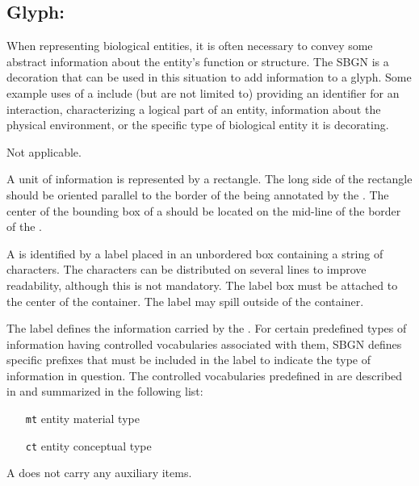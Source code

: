\color{blue}

\subsection{Glyph: }
\label{sec:unitInformation}

When representing biological entities, it is often necessary to convey some abstract information about the entity's function or structure.  The SBGN  is a decoration that can be used in this situation to add information to a glyph.  Some example uses of a  include (but are not limited to) providing an identifier for an interaction, characterizing a logical part of an entity, information about the physical environment, or the specific type of biological entity it is decorating.

\begin{glyphDescription}

\glyphSboTerm Not applicable.

\glyphContainer A unit of information is represented by a rectangle.  The long side of the rectangle should be oriented parallel to the border of the  being annotated by the . The center of the bounding box of a  should be located on the mid-line of the border of the .

\glyphLabel A  is identified by a label placed in an unbordered box containing a string of characters.  The characters can be distributed on several lines to improve readability, although this is not mandatory.  The label box must be attached to the center of the container.  The label may spill outside of the container.

The label defines the information carried by the .  For certain predefined types of information having controlled vocabularies associated with them, SBGN defines specific prefixes that must be included in the label to indicate the type of information in question.  The controlled vocabularies predefined in \SBGNERLone are described in  and summarized in the following list:

\begin{center}
  \begin{itemize}\setlength{\parskip}{0ex}
  \item[\texttt{mt}] entity material type
  \item[\texttt{ct}] entity conceptual type
  \end{itemize}
\end{center}

\glyphAux A  does not carry any auxiliary items.

\end{glyphDescription}

